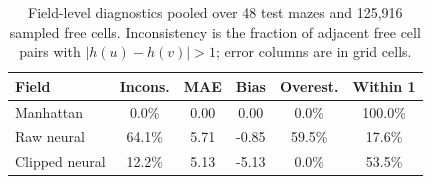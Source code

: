 \begin{table}[H]
\centering
\small
\begin{tabular}{lccccc}
\toprule
\textbf{Field} & \textbf{Incons.} & \textbf{MAE} & \textbf{Bias} & \textbf{Overest.} & \textbf{Within 1} \\
\midrule
Manhattan & 0.0\% & 0.00 & 0.00 & 0.0\% & 100.0\% \\
Raw neural & 64.1\% & 5.71 & -0.85 & 59.5\% & 17.6\% \\
Clipped neural & 12.2\% & 5.13 & -5.13 & 0.0\% & 53.5\% \\
\bottomrule
\end{tabular}
\caption{Field-level diagnostics pooled over 48 test mazes and
125,916 sampled free cells. Inconsistency is the fraction of adjacent free
cell pairs with $|h(u)-h(v)|>1$; error columns are in grid cells.}
\label{tab:phase5_consistency}
\end{table}
